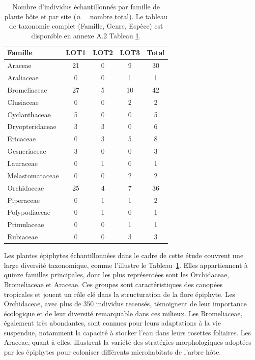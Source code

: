 \documentclass[a4paper,12pt]{article}
\begin{document}
\begin{table}[H]
    \centering
    \caption[Nombre d'individus échantillonnés par famille de plante hôte et par site (\textit{n} = nombre total).] {
    Nombre d'individus échantillonnés par famille de plante hôte et par site (\textit{n} = nombre total).    
    \small 
    Le tableau de taxonomie complet  (Famille, Genre, Espèce) est disponible en annexe A.2 Tableau \ref{tab:plant_families}.}
    \renewcommand{\arraystretch}{1.1}
    \setlength{\tabcolsep}{6pt}
    {\footnotesize
    \begin{tabular}{lcccc}
        \hline
        \textbf{Famille} & \textbf{LOT1} & \textbf{LOT2} & \textbf{LOT3} & \textbf{Total} \\
        \hline
        Araceae         & 21 & 0 & 9 & 30 \\
        Araliaceae      & 0  & 0 & 1 & 1 \\
        Bromeliaceae    & 27 & 5 & 10 & 42 \\
        Clusiaceae      & 0  & 0 & 2 & 2 \\
        Cyclanthaceae   & 5  & 0 & 0 & 5 \\
        Dryopteridaceae & 3  & 3 & 0 & 6 \\
        Ericaceae       & 0  & 3 & 5 & 8 \\
        Gesneriaceae    & 3  & 0 & 0 & 3 \\
        Lauraceae       & 0  & 1 & 0 & 1 \\
        Melastomataceae & 0  & 0 & 2 & 2 \\
        Orchidaceae     & 25 & 4 & 7 & 36 \\
        Piperaceae      & 0  & 1 & 1 & 2 \\
        Polypodiaceae   & 0  & 1 & 0 & 1 \\
        Primulaceae     & 0  & 0 & 1 & 1 \\
        Rubiaceae       & 0  & 0 & 3 & 3 \\
        \hline
    \end{tabular}
    }
    \label{tab:plant_families}
\end{table}

Les plantes épiphytes échantillonnées dans le cadre de cette étude couvrent une large diversité taxonomique, comme l’illustre le Tableau~\ref{tab:plant_families}. Elles appartiennent à quinze familles principales, dont les plus représentées sont les Orchidaceae, Bromeliaceae et Araceae. Ces groupes sont caractéristiques des canopées tropicales et jouent un rôle clé dans la structuration de la flore épiphyte. Les Orchidaceae, avec plus de 350 individus recensés, témoignent de leur importance écologique et de leur diversité remarquable dans ces milieux. Les Bromeliaceae, également très abondantes, sont connues pour leurs adaptations à la vie suspendue, notamment la capacité à stocker l’eau dans leurs rosettes foliaires. Les Araceae, quant à elles, illustrent la variété des stratégies morphologiques adoptées par les épiphytes pour coloniser différents microhabitats de l’arbre hôte.
\end{document}
